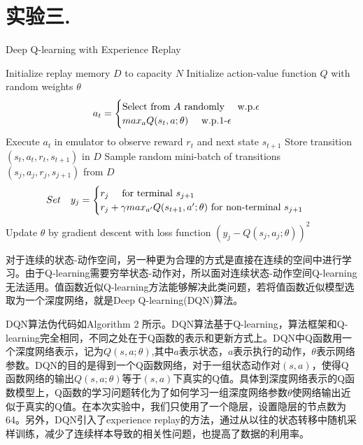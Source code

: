 \documentclass[a4paper,UTF8]{article}
\theoremstyle{definition}
\renewcommand{\algorithmicrequire}{\textbf{Input:}}
\renewcommand{\algorithmicensure}{\textbf{Procedure:}}
\begin{document}
\section*{实验三. }
	\begin{algorithm}[!h]
	\renewcommand{\algorithmicrequire}{\textbf{Input:}}
	\renewcommand{\algorithmicensure}{\textbf{Output:}}
	\caption{Deep Q-learning with Experience Replay}
	\label{alg:2}
	\begin{algorithmic}[1]
		\STATE Initialize replay memory $D$ to capacity $N$
		\STATE Initialize action-value function $Q$ with random weights $\theta$
			\STATE	$$a_t=
\begin{cases}
\text{Select from $A$ randomly \quad w.p.$\epsilon$}\\
\text{$max_a$$Q(s_t,a;\theta)$ \quad w.p.1-$\epsilon$ }
\end{cases}$$
\STATE Execute $a_t$ in emulator to observe reward $r_t$ and next state $s_{t+1}$
\STATE Store transition $(s_t,a_t,r_t,s_{t+1})$ in $D$
\STATE Sample random mini-batch of transitions $(s_j,a_j,r_j,s_{j+1})$ from $D$
\STATE	$$Set \quad y_j=
\begin{cases}
\text{$r_j$ \quad for terminal $s_{j+1}$}\\
\text{$r_j+\gamma max_{a'}Q(s_{t+1},a';\theta)$ for non-terminal $s_{j+1}$ }
\end{cases}$$
\STATE Update $\theta$ by gradient descent with loss function $(y_j-Q(s_j,a_j;\theta))^2$
			\ENDFOR
		\ENDFOR
\end{algorithmic}  
\end{algorithm}
	对于连续的状态-动作空间，另一种更为合理的方式是直接在连续的空间中进行学习。由于Q-learning需要穷举状态-动作对，所以面对连续状态-动作空间Q-learning无法适用。值函数近似Q-learning方法能够解决此类问题，若将值函数近似模型选取为一个深度网络，就是Deep Q-learning(DQN)算法。

	DQN算法伪代码如Algorithm 2 \cite{ref2}所示。DQN算法基于Q-learning，算法框架和Q-learning完全相同，不同之处在于Q函数的表示和更新方式上。DQN中Q函数用一个深度网络表示，记为$Q(s,a;\theta)$,其中$a$表示状态，$a$表示执行的动作，$\theta$表示网络参数。DQN的目的是得到一个Q函数网络，对于一组状态动作对$(s,a)$，使得Q函数网络的输出$Q(s,a;\theta)$等于$(s,a)$下真实的Q值。具体到深度网络表示的Q函数模型上，Q函数的学习问题转化为了如何学习一组深度网络参数$\theta$使网络输出近似于真实的Q值。在本次实验中，我们只使用了一个隐层，设置隐层的节点数为64。另外，DQN引入了experience replay的方法，通过从以往的状态转移中随机采样训练，减少了连续样本导致的相关性问题，也提高了数据的利用率。
\end{document}
